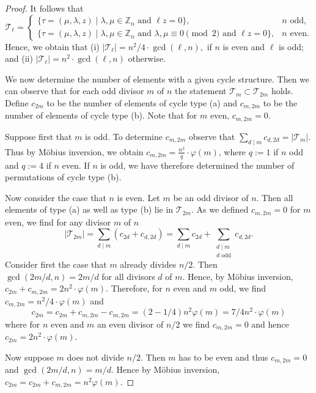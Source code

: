 \documentclass[12pt]{article}
\theoremstyle{definition}
\theoremstyle{remark}
\newcommand{\Z}{{\mathbb{Z}}}
\begin{document}
\begin{proof}
It follows that
\[
\mathcal{T}_\ell = \begin{cases} \{ \tau= (\mu, \lambda, z) \mid \lambda,\mu \in \Z_n  \textrm { and } \ell z = 0 \}, & n \textrm { odd},\\
\{ \tau= (\mu, \lambda,  z) \mid \lambda,\mu \in \Z_n \textrm{ and }
\lambda,\mu\equiv 0\!\!\pmod{2}  \textrm { and } \ell z = 0 \}, & n \textrm{ even}.
\end{cases}
\]
Hence, we obtain that (i) $\vert \mathcal{T}_\ell\vert=n^2/4\cdot \gcd(\ell,n),$ if $n$ is even and $\ell$ is odd; and (ii) $\vert \mathcal{T}_\ell\vert= n^2\cdot \gcd(\ell,n)$ otherwise.




We now determine the number of elements with a given cycle structure.
Then we can observe that for each odd divisor $m$ of $n$ the statement $\mathcal{T}_m \subset \mathcal{T}_{2m}$ holds.
Define $c_{2m}$ to be the number of elements of cycle type (a) and
${c}_{m,2m}$ to  be the number of elements of cycle type (b). Note that for $m$ even, $c_{m,2m}=0.$


Suppose first that $m$ is odd.
To determine
${c}_{m,2m}$ observe
that   $\sum_{d\mid m} c_{d,2d}= |\mathcal{T}_m\vert .$
Thus by M\"obius inversion, we obtain $c_{m,2m}=\frac{n^2}{q}\cdot \varphi(m)$, where $q:=1$ if $n$ odd and $q:=4$ if $n$ even.
If $n$ is odd, we have therefore determined the number of permutations of cycle type (b).

Now consider the case that $n$ is even. Let $m$ be an odd divisor of $n.$ Then all elements of type (a) as well as type (b) lie in $\mathcal{T}_{2m}.$ As we defined $c_{m,2m}=0$ for $m$ even, we find for any divisor $m$ of $n$
\[|\mathcal{T}_{2m}| = \sum_{d\mid m}( c_{2d}+ c_{d,2d}) =
\sum_{d\mid m} c_{2d} +
\sum_{\substack{d\mid m\\d \textrm{ odd}}}c_{d,2d}.
\]
Consider first the case that $m$ already divides $n/2.$
Then $\gcd(2m/d,n) = 2m/d$ for all divisors $d$ of $m.$
Hence, by M\"obius inversion, $c_{2m}+ c_{m,2m}=2n^2 \cdot \varphi(m).$
Therefore, for $n$ even and $m$ odd, we find $c_{m,2m} = n^2/4\cdot\varphi(m)$ and $$c_{2m}=c_{2m}+c_{m,2m}-c_{m,2m}=(2-1/4)n^2\varphi(m)  = 7/4n^2 \cdot \varphi(m)$$ where for $n$ even
and $m$ an even divisor of $n/2$ we find $c_{m,2m}=0$
and hence
$c_{2m} = 2n^2 \cdot \varphi(m).$


Now suppose $m$ does not divide $n/2.$ Then $m$ has to be even and thus $c_{m,2m}=0$
and  $\gcd( 2m/d, n)  = m/d.$
Hence by M\"obius inversion, $c_{2m}= c_{2m}+ c_{m,2m}= n^2\varphi(m).$
\end{proof}
\end{document}
